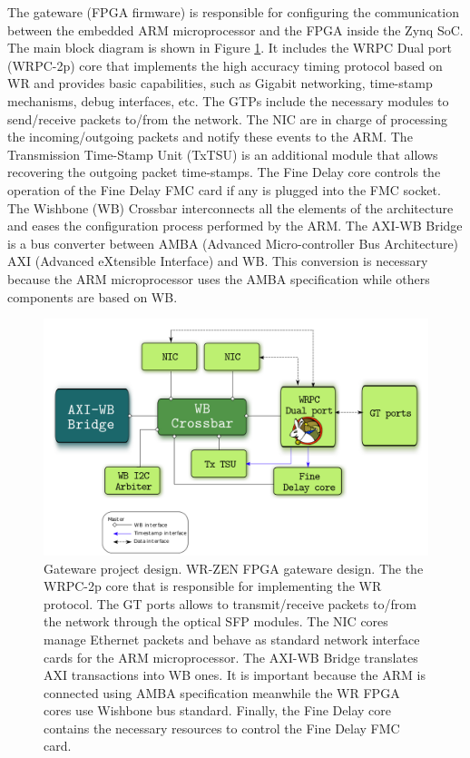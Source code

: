 The gateware (FPGA firmware) is responsible for configuring the communication between the embedded ARM microprocessor and the FPGA inside the Zynq SoC. 
The main block diagram is shown in Figure \ref{fig:gateware_first_level}. 
It includes the WRPC Dual port (WRPC-2p) \cite{torres2016scalability} core that implements the high accuracy timing protocol based on WR and provides basic capabilities, such as Gigabit networking, time-stamp mechanisms, debug interfaces, etc. The GTPs include the necessary modules to send/receive packets to/from the network. The NIC are in charge of processing the incoming/outgoing
packets and notify these events to the ARM. The Transmission Time-Stamp Unit
(TxTSU) is an additional module that allows recovering the outgoing packet
time-stamps. The Fine Delay core controls the operation of the Fine Delay FMC
card if any is plugged into the FMC socket. The Wishbone (WB) Crossbar
interconnects all the elements of the architecture and eases the configuration
process performed by the ARM. The AXI-WB Bridge is a bus converter between AMBA (Advanced Micro-controller Bus Architecture)
AXI (Advanced eXtensible Interface) and WB. This conversion is necessary because the ARM microprocessor
uses the AMBA specification while others components are based on WB.

\begin{figure}[H] \centering
	\includegraphics[scale=0.4]{img/gateware_first_level} \caption{Gateware
	project design. WR-ZEN FPGA gateware design. The the WRPC-2p core that is responsible for implementing the WR protocol. The GT ports allows to transmit/receive packets to/from the network through the optical SFP modules. The NIC cores manage Ethernet packets and behave as standard network interface cards for the ARM microprocessor. The AXI-WB Bridge translates AXI transactions into WB ones. It is important because the ARM is connected using AMBA specification meanwhile the WR FPGA cores use Wishbone bus standard. Finally, the Fine Delay core contains the necessary resources to control the Fine Delay FMC card.} \label{fig:gateware_first_level} 
\end{figure}

